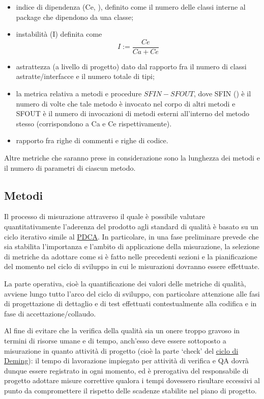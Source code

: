 \begin{itemize}
  \item indice di dipendenza (Ce, ), definito come il numero delle classi interne al package che dipendono da una classe;
  \item instabilità (I) definita come \[
  I := \frac{Ce}{Ca + Ce}
  \]
  \item astrattezza (a livello di progetto) dato dal rapporto fra il numero di classi astratte/interfacce e il numero totale di tipi;
  \item la metrica relativa a metodi e procedure $SFIN - SFOUT$, dove SFIN () è il numero di volte che tale metodo è invocato nel corpo di altri metodi e SFOUT è il numero di invocazioni di metodi esterni all'interno del metodo stesso (corrispondono a Ca e Ce rispettivamente).
  \item rapporto fra righe di commenti e righe di codice.
\end{itemize}

Altre metriche che saranno prese in considerazione sono la lunghezza dei metodi e il numero di parametri di ciascun metodo.

\subsection{Metodi}
 Il processo di misurazione attraverso il quale è possibile valutare quantitativamente l'aderenza del prodotto agli standard di qualità è basato su un ciclo iterativo simile al \underline{PDCA}\@. In particolare, in una fase preliminare prevede che sia stabilita l'importanza e l'ambito di applicazione della misurazione, la selezione di metriche da adottare come si è fatto nelle precedenti sezioni e la pianificazione del momento nel ciclo di sviluppo in cui le misurazioni dovranno essere effettuate.

La parte operativa, cioè la quantificazione dei valori delle metriche di qualità, avviene lungo tutto l'arco del ciclo di sviluppo, con particolare attenzione alle fasi di progettazione di dettaglio e di test effettuati contestualmente alla codifica e in fase di accettazione/collaudo.

 Al fine di evitare che la verifica della qualità sia un onere troppo gravoso in termini di risorse umane e di tempo, anch'esso deve essere sottoposto a misurazione in quanto attività di progetto (cioè la parte `check' del \underline{ciclo di Deming}): il tempo di lavorazione impiegato per attività di verifica e QA dovrà dunque essere registrato in ogni momento, ed è prerogativa del responsabile di progetto adottare misure correttive qualora i tempi dovessero risultare eccessivi al punto da compromettere il rispetto delle scadenze stabilite nel piano di progetto.

